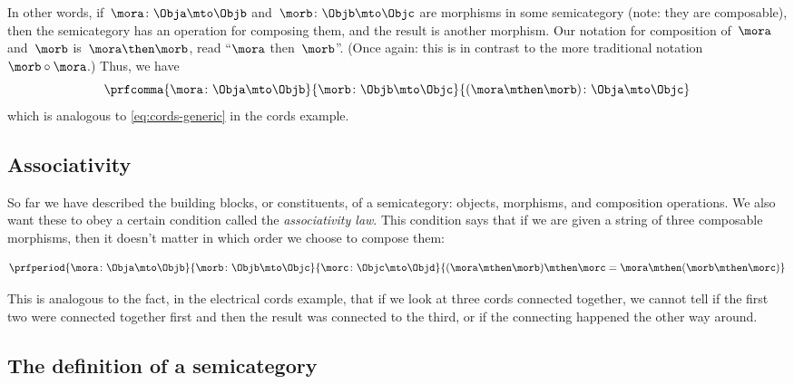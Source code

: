 In other words, if~$\mora\colon \Obja \mto \Objb$ and~$\morb\colon \Objb \mto \Objc$ are morphisms in some semicategory (note: they are composable), then the semicategory has an operation for composing them, and the result is another morphism.
Our notation for composition of~$\mora$ and~$\morb$ is~$\mora \then \morb$, read ``$\mora$ then~$\morb$''.
(Once again: this is in contrast to the more traditional notation~$\morb \circ \mora$.)
Thus, we have
\begin{equation}
    \prfcomma{
        \mora \colon \Obja \mto \Objb
    }{
        \morb\colon \Objb \mto \Objc
    }{
        (\mora \mthen \morb )\colon \Obja \mto \Objc
    }
\end{equation}
which is analogous to \cref{eq:cords-generic} in the cords example.

\subsection{Associativity}

So far we have described the building blocks, or constituents, of a semicategory: objects, morphisms, and composition operations.
We also want these to obey a certain condition called the \emph{associativity law}.
This condition says that if we are given a string of three composable morphisms, then it doesn't matter in which order we choose to compose them:

\begin{equation}
    \prfperiod{
        \mora \colon \Obja \mto \Objb
    }{
        \morb\colon \Objb \mto \Objc
    }{
        \morc \colon \Objc \mto \Objd
    }{
        (\mora \mthen \morb ) \mthen \morc = \mora \mthen ( \morb  \mthen \morc )
    }
\end{equation}

This is analogous to the fact, in the electrical cords example, that if we look at three cords connected together, we cannot tell if the first two were connected together first and then the result was connected to the third, or if the connecting happened the other way around.

\subsection{The definition of a semicategory}

